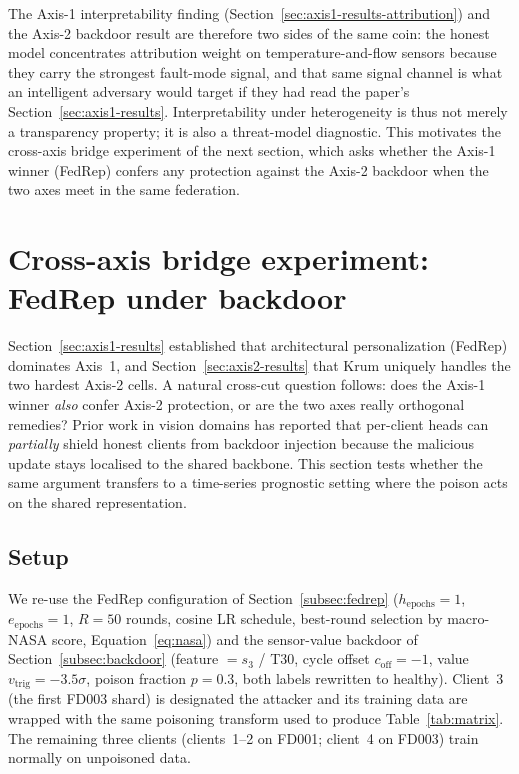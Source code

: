 \documentclass[preprint,12pt,authoryear]{elsarticle}
\begin{document}
The Axis-1 interpretability finding
(Section~\ref{sec:axis1-results-attribution}) and the Axis-2 backdoor
result are therefore two sides of the same coin: the honest model
concentrates attribution weight on temperature-and-flow sensors
because they carry the strongest fault-mode signal, and that same
signal channel is what an intelligent adversary would target if
they had read the paper's Section~\ref{sec:axis1-results}.
Interpretability under heterogeneity is thus not merely a
transparency property; it is also a threat-model diagnostic. This
motivates the cross-axis bridge experiment of the next section,
which asks whether the Axis-1 winner (FedRep) confers any
protection against the Axis-2 backdoor when the two axes meet in
the same federation.



\section{Cross-axis bridge experiment: FedRep under backdoor}
\label{sec:bridge}

Section~\ref{sec:axis1-results} established that architectural
personalization (FedRep) dominates Axis~1, and
Section~\ref{sec:axis2-results} that Krum uniquely handles the two
hardest Axis-2 cells. A natural cross-cut question follows: does the
Axis-1 winner \emph{also} confer Axis-2 protection, or are the two
axes really orthogonal remedies? Prior work in vision domains
\citep{Zhang2024SARS, Fan2026RobustPFL} has reported that per-client
heads can \emph{partially} shield honest clients from backdoor
injection because the malicious update stays localised to the shared
backbone. This section tests whether the same argument transfers to
a time-series prognostic setting where the poison acts on the shared
representation.

\subsection{Setup}
\label{sec:bridge-setup}

We re-use the FedRep configuration of Section~\ref{subsec:fedrep}
($h_{\mathrm{epochs}} = 1$, $e_{\mathrm{epochs}} = 1$, $R = 50$
rounds, cosine LR schedule, best-round selection by macro-NASA
score, Equation~\ref{eq:nasa}) and the sensor-value backdoor of
Section~\ref{subsec:backdoor} (feature $= s_3$ / T30, cycle offset
$c_{\mathrm{off}} = -1$, value $v_{\mathrm{trig}} = -3.5\sigma$,
poison fraction $p = 0.3$, both labels rewritten to healthy).
Client~3 (the first FD003 shard) is designated the attacker and its
training data are wrapped with the same poisoning transform used to
produce Table~\ref{tab:matrix}. The remaining three clients
(clients~1--2 on FD001; client~4 on FD003) train normally on
unpoisoned data.
\end{document}
